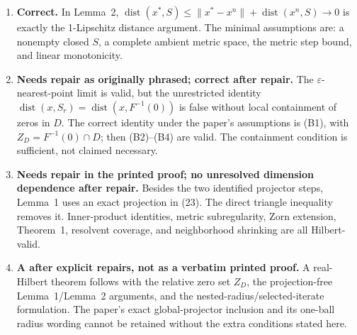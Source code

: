 \documentclass[11pt]{article}
\newcommand{\dist}{\operatorname{dist}}
\begin{document}
\begin{enumerate}[label=\arabic*.]
\item \textbf{Correct.} In Lemma~2, \(\dist(x^*,S)\le\|x^*-x^n\|+\dist(x^n,S)\to0\) is exactly the 1-Lipschitz distance argument. The minimal assumptions are: a nonempty closed \(S\), a complete ambient metric space, the metric step bound, and linear monotonicity.
\item \textbf{Needs repair as originally phrased; correct after repair.} The \(\varepsilon\)-nearest-point limit is valid, but the unrestricted identity \(\dist(x,S_r)=\dist(x,F^{-1}(0))\) is false without local containment of zeros in \(D\). The correct identity under the paper's assumptions is (B1), with \(Z_D=F^{-1}(0)\cap D\); then (B2)--(B4) are valid. The containment condition is sufficient, not claimed necessary.
\item \textbf{Needs repair in the printed proof; no unresolved dimension dependence after repair.} Besides the two identified projector steps, Lemma~1 uses an exact projection in (23). The direct triangle inequality removes it. Inner-product identities, metric subregularity, Zorn extension, Theorem~1, resolvent coverage, and neighborhood shrinking are all Hilbert-valid.
\item \textbf{A after explicit repairs, not as a verbatim printed proof.} A real-Hilbert theorem follows with the relative zero set \(Z_D\), the projection-free Lemma~1/Lemma~2 arguments, and the nested-radius/selected-iterate formulation. The paper's exact global-projector inclusion and its one-ball radius wording cannot be retained without the extra conditions stated here.
\end{enumerate}
\end{document}
